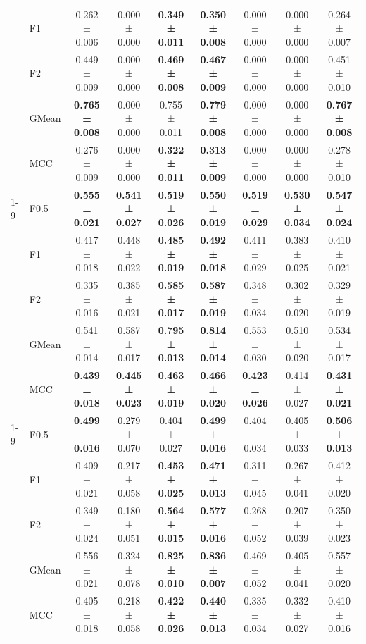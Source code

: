 \begin{table}[H]
{\begin{tabular}{llccccccc}
 & F1 & 0.262 ± 0.006 & 0.000 ± 0.000 & \textbf{0.349 ± 0.011} & \textbf{0.350 ± 0.008} & 0.000 ± 0.000 & 0.000 ± 0.000 & 0.264 ± 0.007 \\
 & F2 & 0.449 ± 0.009 & 0.000 ± 0.000 & \textbf{0.469 ± 0.008} & \textbf{0.467 ± 0.009} & 0.000 ± 0.000 & 0.000 ± 0.000 & 0.451 ± 0.010 \\
 & GMean & \textbf{0.765 ± 0.008} & 0.000 ± 0.000 & 0.755 ± 0.011 & \textbf{0.779 ± 0.008} & 0.000 ± 0.000 & 0.000 ± 0.000 & \textbf{0.767 ± 0.008} \\
 & MCC & 0.276 ± 0.009 & 0.000 ± 0.000 & \textbf{0.322 ± 0.011} & \textbf{0.313 ± 0.009} & 0.000 ± 0.000 & 0.000 ± 0.000 & 0.278 ± 0.010 \\
\cline{1-9}
\multirow[t]{5}{*}{LGBM()} & F0.5 & \textbf{0.555 ± 0.021} & \textbf{0.541 ± 0.027} & \textbf{0.519 ± 0.026} & \textbf{0.550 ± 0.019} & \textbf{0.519 ± 0.029} & \textbf{0.530 ± 0.034} & \textbf{0.547 ± 0.024} \\
 & F1 & 0.417 ± 0.018 & 0.448 ± 0.022 & \textbf{0.485 ± 0.019} & \textbf{0.492 ± 0.018} & 0.411 ± 0.029 & 0.383 ± 0.025 & 0.410 ± 0.021 \\
 & F2 & 0.335 ± 0.016 & 0.385 ± 0.021 & \textbf{0.585 ± 0.017} & \textbf{0.587 ± 0.019} & 0.348 ± 0.034 & 0.302 ± 0.020 & 0.329 ± 0.019 \\
 & GMean & 0.541 ± 0.014 & 0.587 ± 0.017 & \textbf{0.795 ± 0.013} & \textbf{0.814 ± 0.014} & 0.553 ± 0.030 & 0.510 ± 0.020 & 0.534 ± 0.017 \\
 & MCC & \textbf{0.439 ± 0.018} & \textbf{0.445 ± 0.023} & \textbf{0.463 ± 0.019} & \textbf{0.466 ± 0.020} & \textbf{0.423 ± 0.026} & 0.414 ± 0.027 & \textbf{0.431 ± 0.021} \\
\cline{1-9}
\multirow[t]{5}{*}{LogisticRegression()} & F0.5 & \textbf{0.499 ± 0.016} & 0.279 ± 0.070 & 0.404 ± 0.027 & \textbf{0.499 ± 0.016} & 0.404 ± 0.034 & 0.405 ± 0.033 & \textbf{0.506 ± 0.013} \\
 & F1 & 0.409 ± 0.021 & 0.217 ± 0.058 & \textbf{0.453 ± 0.025} & \textbf{0.471 ± 0.013} & 0.311 ± 0.045 & 0.267 ± 0.041 & 0.412 ± 0.020 \\
 & F2 & 0.349 ± 0.024 & 0.180 ± 0.051 & \textbf{0.564 ± 0.015} & \textbf{0.577 ± 0.016} & 0.268 ± 0.052 & 0.207 ± 0.039 & 0.350 ± 0.023 \\
 & GMean & 0.556 ± 0.021 & 0.324 ± 0.078 & \textbf{0.825 ± 0.010} & \textbf{0.836 ± 0.007} & 0.469 ± 0.052 & 0.405 ± 0.041 & 0.557 ± 0.020 \\
 & MCC & 0.405 ± 0.018 & 0.218 ± 0.058 & \textbf{0.422 ± 0.026} & \textbf{0.440 ± 0.013} & 0.335 ± 0.034 & 0.332 ± 0.027 & 0.410 ± 0.016 \\

\end{tabular}}
\end{table}
